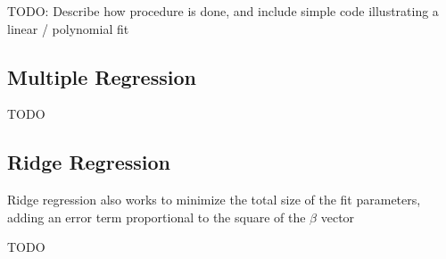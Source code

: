 TODO: Describe how procedure is done, and include simple code illustrating a linear / polynomial fit

\subsection{Multiple Regression}
TODO


\subsection{Ridge Regression}
Ridge regression also works to minimize the total size of the fit parameters, adding an error term proportional to the square of the $\beta$ vector

TODO

